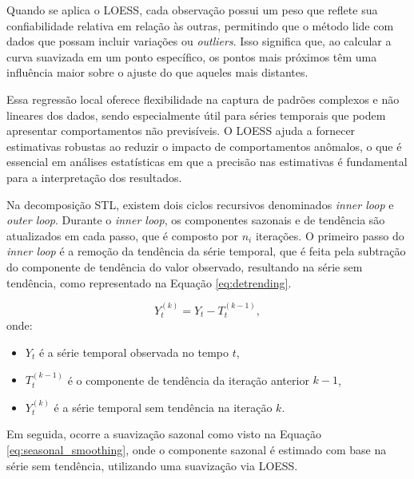 Quando se aplica o LOESS, cada observação possui um peso que reflete sua confiabilidade relativa em relação às outras, permitindo que o método lide com dados que possam incluir variações ou \textit{outliers}. Isso significa que, ao calcular a curva suavizada em um ponto específico, os pontos mais próximos têm uma influência maior sobre o ajuste do que aqueles mais distantes.

Essa regressão local oferece flexibilidade na captura de padrões complexos e não lineares dos dados, sendo especialmente útil para séries temporais que podem apresentar comportamentos não previsíveis. O LOESS ajuda a fornecer estimativas robustas ao reduzir o impacto de comportamentos anômalos, o que é essencial em análises estatísticas em que a precisão nas estimativas é fundamental para a interpretação dos resultados.

Na decomposição STL, existem dois ciclos recursivos denominados \textit{inner loop} e \textit{outer loop}. Durante o \textit{inner loop}, os componentes sazonais e de tendência são atualizados em cada passo, que é composto por \( n_i \) iterações. O primeiro passo do \textit{inner loop} é a remoção da tendência da série temporal, que é feita pela subtração do componente de tendência do valor observado, resultando na série sem tendência, como representado na Equação \eqref{eq:detrending}.

\begin{equation}
    Y^{(k)}_t = Y_t - T^{(k-1)}_t,
    \label{eq:detrending}
\end{equation}
onde:
\begin{itemize}
    \item \( Y_t \) é a série temporal observada no tempo \( t \),
    \item \( T^{(k-1)}_t \) é o componente de tendência da iteração anterior \( k-1 \),
    \item \( Y^{(k)}_t \) é a série temporal sem tendência na iteração \( k \).
\end{itemize}


Em seguida, ocorre a suavização sazonal como visto na Equação \eqref{eq:seasonal_smoothing}, onde o componente sazonal é estimado com base na série sem tendência, utilizando uma suavização via LOESS.

